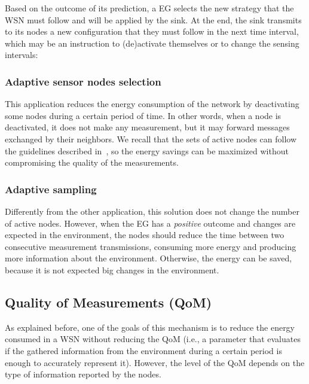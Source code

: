 \documentclass{llncs}
\newcommand{\EG}[1]{EG}
\begin{document}
Based on the outcome of its prediction, a \EG{} selects the new strategy that 
the WSN must follow and will be applied by the sink. 
At the end, the sink transmits to its nodes a new configuration that they must 
follow in the next time interval, which may be an instruction to (de)activate 
themselves or to change the sensing intervals:

\subsubsection{Adaptive sensor nodes selection}

This application reduces the energy consumption of the network by deactivating 
some nodes during a certain period of time. In other words, when a node is 
deactivated, it does not make any measurement, but it may forward messages 
exchanged by their neighbors.
We recall that the sets of active nodes can follow the guidelines described 
in~\cite{Yann-Ael2005}, so the energy savings can be maximized without 
compromising the quality of the measurements.

\subsubsection{Adaptive sampling}

Differently from the other application, this solution does not change the 
number of active nodes. However, when the \EG{} has a \emph{positive} outcome 
and changes are expected in the environment, the nodes should reduce the 
time between two consecutive measurement transmissions, consuming more energy 
and producing more information about the environment. Otherwise, the energy can 
be saved, because it is not expected big changes in the environment.

\subsection{Quality of Measurements (QoM)}
\label{sec:qom}

As explained before, one of the goals of this mechanism is to reduce the 
energy consumed in a WSN without reducing the QoM (i.e., a parameter that 
evaluates if the gathered information from the environment during a certain 
period is enough to accurately represent it). However, the level of the QoM 
depends on the type of information reported by the nodes.
\end{document}
